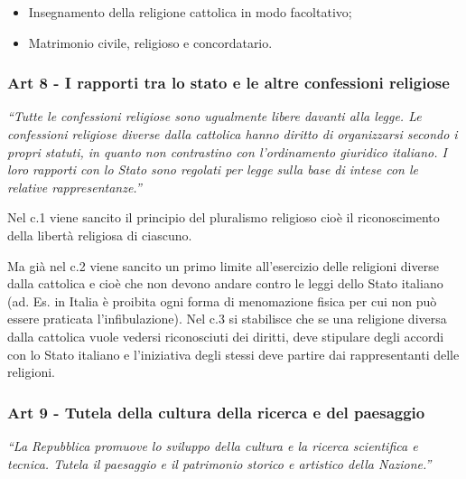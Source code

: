 \documentclass{report}
\begin{document}
\begin{itemize}
  \item Insegnamento della religione cattolica in modo facoltativo;
  \item Matrimonio civile, religioso e concordatario.
\end{itemize}

\subsubsection{Art 8 - I rapporti tra lo stato e le altre confessioni religiose}

\textit{“Tutte le confessioni religiose sono ugualmente libere davanti alla legge.
Le confessioni religiose diverse dalla cattolica hanno diritto di organizzarsi secondo i propri statuti, in quanto non
contrastino con l’ordinamento giuridico italiano.
I loro rapporti con lo Stato sono regolati per legge sulla base di intese con le relative rappresentanze.”}

Nel c.1 viene sancito il principio del pluralismo religioso cioè il riconoscimento della libertà religiosa di
ciascuno.

Ma già nel c.2 viene sancito un primo limite all’esercizio delle religioni diverse dalla cattolica e cioè che non devono
andare contro le leggi dello Stato italiano (ad. Es. in Italia è proibita ogni forma di menomazione fisica per cui
non può essere praticata l’infibulazione).
Nel c.3 si stabilisce che se una religione diversa dalla cattolica vuole vedersi riconosciuti dei diritti, deve
stipulare degli accordi con lo Stato italiano e l’iniziativa degli stessi deve partire dai rappresentanti delle
religioni.

\subsubsection{Art 9 - Tutela della cultura della ricerca e del paesaggio}

\textit{“La Repubblica promuove lo sviluppo della cultura e la ricerca scientifica e tecnica.
Tutela il paesaggio e il patrimonio storico e artistico della Nazione.”}
\end{document}
